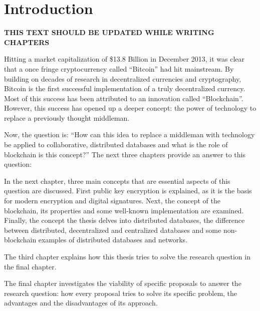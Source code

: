 \chapter{Introduction}

\textbf{THIS TEXT SHOULD BE UPDATED WHILE WRITING CHAPTERS}


Hitting a market capitalization of \$13.8 Billion in December 2013, it was clear that a once fringe cryptocurrency called ``Bitcoin'' had hit mainstream. By building on decades of research in decentralized currencies and cryptography, Bitcoin is the first successful implementation of a truly decentralized currency. Most of this success has been attributed to an innovation called ``Blockchain''. However, this success has opened up a deeper concept: the power of technology to replace a previously thought middleman.


Now, the question is: ``How can this idea to replace a middleman with technology be applied to collaborative, distributed databases and what is the role of blockchain is this concept?'' The next three chapters provide an answer to this question:


In the next chapter, three main concepts that are essential aspects of this question are discussed. First public key encryption is explained, as it is the basis for modern encryption and digital signatures. Next, the concept of the blockchain, its properties and some well-known implementation are examined. Finally, the concept the thesis delves into distributed databases, the difference between distributed, decentralized and centralized databases and some non-blockchain examples of distributed databases and networks.

The third chapter explains how this thesis tries to solve the research question in the final chapter.

The final chapter investigates the viability of specific proposals to answer the research question: how every proposal tries to solve its specific problem, the advantages and the disadvantages of its approach.